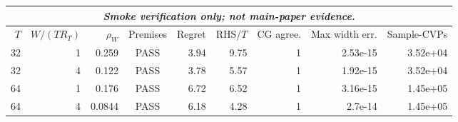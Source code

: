 \begin{tabular}{rrrcrrrrr}
\toprule
\multicolumn{9}{c}{\emph{Smoke verification only; not main-paper evidence.}} \\
\midrule
$T$ & $W/(T R_T)$ & $\rho_W$ & Premises & Regret & RHS/$T$ & CG agree. & Max width err. & Sample-CVPs \\
\midrule
32 & 1 & 0.259 & PASS & 3.94 & 9.75 & 1 & 2.53e-15 & 3.52e+04 \\
32 & 4 & 0.122 & PASS & 3.78 & 5.57 & 1 & 1.92e-15 & 3.52e+04 \\
64 & 1 & 0.176 & PASS & 6.72 & 6.52 & 1 & 3.16e-15 & 1.45e+05 \\
64 & 4 & 0.0844 & PASS & 6.18 & 4.28 & 1 & 2.7e-14 & 1.45e+05 \\
\bottomrule
\end{tabular}
